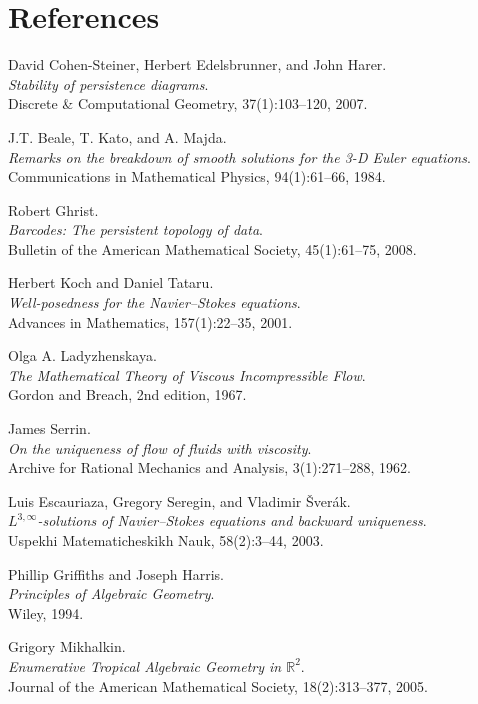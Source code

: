 \documentclass[11pt]{article}
\theoremstyle{definition}
\begin{document}
\section*{References}
\begin{thebibliography}{9}

David Cohen-Steiner, Herbert Edelsbrunner, and John Harer.\\
\textit{Stability of persistence diagrams}.\\
Discrete \& Computational Geometry, 37(1):103--120, 2007.

J.T. Beale, T. Kato, and A. Majda.\\
\textit{Remarks on the breakdown of smooth solutions for the 3-D Euler equations}.\\
Communications in Mathematical Physics, 94(1):61--66, 1984.

Robert Ghrist.\\
\textit{Barcodes: The persistent topology of data}.\\
Bulletin of the American Mathematical Society, 45(1):61--75, 2008.

Herbert Koch and Daniel Tataru.\\
\textit{Well-posedness for the Navier–Stokes equations}.\\
Advances in Mathematics, 157(1):22--35, 2001.

Olga A. Ladyzhenskaya.\\
\textit{The Mathematical Theory of Viscous Incompressible Flow}.\\
Gordon and Breach, 2nd edition, 1967.

James Serrin.\\
\textit{On the uniqueness of flow of fluids with viscosity}.\\
Archive for Rational Mechanics and Analysis, 3(1):271--288, 1962.

Luis Escauriaza, Gregory Seregin, and Vladimir \v{S}ver\'ak.\\
\textit{$L^{3,\infty}$-solutions of Navier–Stokes equations and backward uniqueness}.\\
Uspekhi Matematicheskikh Nauk, 58(2):3--44, 2003.

Phillip Griffiths and Joseph Harris.\\
\textit{Principles of Algebraic Geometry}.\\
Wiley, 1994.

Grigory Mikhalkin.\\
\textit{Enumerative Tropical Algebraic Geometry in $\mathbb{R}^2$}.\\
Journal of the American Mathematical Society, 18(2):313--377, 2005.

\end{thebibliography}
\end{document}
